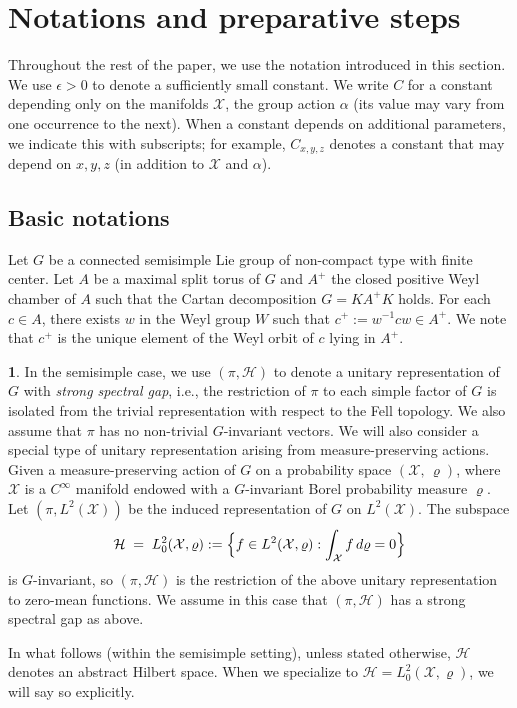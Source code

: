 \documentclass[11 pt]{amsart}
\theoremstyle{definition}
\newtheorem{cect6}{}
\numberwithin{equation}{section}
\begin{document}
\section{Notations and preparative steps}\label{sec:33}





Throughout the rest of the paper, we use the notation introduced in this section. We use $\epsilon>0$ to denote a sufficiently small constant.    We write $C$ for a constant depending only on the manifolds $\mathcal{X}$, the group action $\alpha$ (its value may vary from one occurrence to the next). When a constant depends on additional parameters, we indicate this with subscripts; for example, $C_{x,y,z}$ denotes a constant that may depend on $x,y,z$ (in addition to $\mathcal{X}$ and $\alpha$).

\subsection{Basic notations} Let $G$ be a connected semisimple Lie group of non-compact type with finite center. Let $A$ be a maximal split torus of $G$ and $A^+$ the closed positive Weyl chamber of $A$ such
that the Cartan decomposition $G=KA^+K$ holds. For each $c\in A$, there exists $w$ in the Weyl group $W$ such that $c^+:=w^{-1}cw\in A^+$. We note that $c^+$ is the unique element of the Weyl orbit of $c$
lying in $A^+$.
\begin{cect6}\label{for:120} In the semisimple case, we use $(\pi,\mathcal H)$ to denote a unitary representation of $G$ with \emph{strong spectral gap}, i.e., the restriction of $\pi$ to each simple factor of $G$ is isolated
from the trivial representation with respect to the Fell topology. We also assume that $\pi$ has no non-trivial $G$-invariant vectors.  We will also consider a special type of unitary representation arising from measure-preserving actions.  Given a measure-preserving action of $G$ on a probability space $(\mathcal{X},\,\varrho)$, where $\mathcal X$ is a $C^\infty$ manifold endowed with a $G$-invariant Borel probability measure $\varrho$. Let $(\pi, L^2(\mathcal{X}))$ be the induced representation of $G$ on $L^2(\mathcal{X})$. The subspace
\[
\mathcal H \;=\; L_0^2(\mathcal X,\varrho)
:= \Bigl\{f\in L^2(\mathcal X,\varrho): \int_{\mathcal X} f\,d\varrho = 0\Bigr\}
\]
is $G$-invariant, so $(\pi,\mathcal H)$ is the restriction of the above unitary
representation to zero-mean functions.
 We assume in this case that $(\pi,\mathcal H)$ has a strong spectral gap as above.

In what follows (within the semisimple setting), unless stated otherwise, $\mathcal H$ denotes an abstract Hilbert space. When we specialize to $\mathcal H=L^2_0(\mathcal X,\varrho)$, we will say so explicitly.


\end{cect6}
\end{document}
